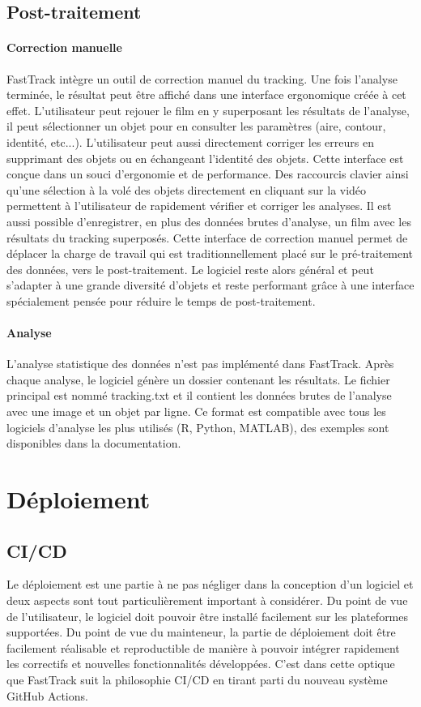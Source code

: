 		\subsection{Post-traitement}
		
		\paragraph{Correction manuelle}
		FastTrack intègre un outil de correction manuel du tracking. Une fois l'analyse terminée, le résultat peut être affiché dans une interface ergonomique créée à cet effet. L'utilisateur peut rejouer le film en y superposant les résultats de l'analyse, il peut sélectionner un objet pour en consulter les paramètres (aire, contour, identité, etc...). L'utilisateur peut aussi directement corriger les erreurs en supprimant des objets ou en échangeant l'identité des objets. Cette interface est conçue dans un souci d'ergonomie et de performance. Des raccourcis clavier ainsi qu'une sélection à la volé des objets directement en cliquant sur la vidéo permettent à l'utilisateur de rapidement vérifier et corriger les analyses. Il est aussi possible d'enregistrer, en plus des données brutes d'analyse, un film avec les résultats du tracking superposés.
		Cette interface de correction manuel permet de déplacer la charge de travail qui est traditionnellement placé sur le pré-traitement des données, vers le post-traitement. Le logiciel reste alors général et peut s'adapter à une grande diversité d'objets et reste performant grâce à une interface spécialement pensée pour réduire le temps de post-traitement.
		
		\paragraph{Analyse}
		L'analyse statistique des données n'est pas implémenté dans FastTrack. Après chaque analyse, le logiciel génère un dossier contenant les résultats. Le fichier principal est nommé tracking.txt et il contient les données brutes de l'analyse avec une image et un objet par ligne. Ce format est compatible avec tous les logiciels d'analyse les plus utilisés (R, Python, MATLAB), des exemples sont disponibles dans la documentation.
		
	\section{Déploiement}
		\subsection{CI/CD}
		Le déploiement est une partie à ne pas négliger dans la conception d'un logiciel et deux aspects sont tout particulièrement important à considérer. Du point de vue de l'utilisateur, le logiciel doit pouvoir être installé facilement sur les plateformes supportées. Du point de vue du mainteneur, la partie de déploiement doit être facilement réalisable et reproductible de manière à pouvoir intégrer rapidement les correctifs et nouvelles fonctionnalités développées. C'est dans cette optique que FastTrack suit la philosophie CI/CD \cite{shahin2017continuous}\cite{wikstrom2019benefits} en tirant parti du nouveau système GitHub Actions.
\medbreak
		
